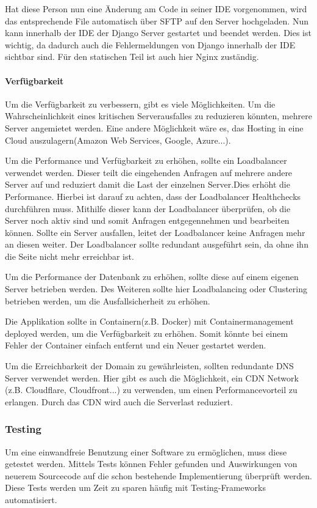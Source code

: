 Hat diese Person nun eine Änderung am Code in seiner IDE vorgenommen, wird das entsprechende File automatisch über SFTP auf den Server hochgeladen. Nun kann innerhalb der IDE der Django Server gestartet und beendet werden. Dies ist wichtig, da dadurch auch die Fehlermeldungen von Django innerhalb der \gls{IDE} sichtbar sind. Für den statischen Teil ist auch hier Nginx zuständig.

\paragraph{Verfügbarkeit}
Um die Verfügbarkeit zu verbessern, gibt es viele Möglichkeiten. Um die Wahrscheinlichkeit eines kritischen Serverausfalles zu reduzieren könnten, mehrere Server angemietet werden. Eine andere Möglichkeit wäre es, das Hosting in eine Cloud auszulagern(Amazon Web Services, Google, Azure...). 

Um die Performance und Verfügbarkeit zu erhöhen, sollte ein Loadbalancer verwendet werden. Dieser teilt die eingehenden Anfragen auf mehrere andere Server auf und reduziert damit die Last der einzelnen Server.Dies erhöht die Performance. Hierbei ist darauf zu achten, dass der Loadbalancer Healthchecks durchführen muss. Mithilfe dieser kann der Loadbalancer überprüfen, ob die Server noch aktiv sind und somit Anfragen entgegennehmen und bearbeiten können. Sollte ein Server ausfallen, leitet der Loadbalancer keine Anfragen mehr an diesen weiter. Der Loadbalancer sollte redundant ausgeführt sein, da ohne ihn die Seite nicht mehr erreichbar ist. 

Um die Performance der Datenbank zu erhöhen, sollte diese auf einem eigenen Server betrieben werden. Des Weiteren sollte hier Loadbalancing oder Clustering betrieben werden, um die Ausfallsicherheit zu erhöhen. \cite{CLUSTER}

Die Applikation sollte in Containern(z.B. Docker) mit Containermanagement deployed werden, um die Verfügbarkeit zu erhöhen. Somit könnte bei einem Fehler der Container einfach entfernt und ein Neuer gestartet werden. 

Um die Erreichbarkeit der Domain zu gewährleisten, sollten redundante DNS Server verwendet werden. Hier gibt es auch die Möglichkeit, ein CDN Network (z.B. Cloudflare, Cloudfront...) zu verwenden, um einen Performancevorteil zu erlangen. Durch das CDN wird auch die Serverlast reduziert.

\newpage

\subsubsection{Testing}
Um eine einwandfreie Benutzung einer Software zu ermöglichen, muss diese getestet werden. Mittels Tests können Fehler gefunden und Auswirkungen von neuerem Sourcecode auf die schon bestehende Implementierung überprüft werden. Diese Tests werden um Zeit zu sparen häufig mit Testing-Frameworks automatisiert.

